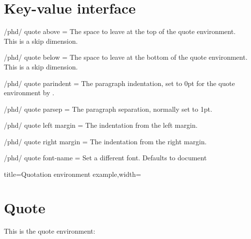 \section{Key-value interface}


\begin{key}{/phd/ quote above = } The space to leave at the top of the quote environment. This is a skip dimension. 
\end{key}

\begin{key}{/phd/ quote below = } The space to leave at the bottom of the quote environment. This is a skip dimension. 
\end{key}
\begin{key}{/phd/ quote parindent = } The paragraph indentation, set to 0pt for the quote environment by
\latex.
\end{key}
\begin{key}{/phd/ quote parsep = } The paragraph separation, normally set to 1pt.
\end{key}
\begin{key}{/phd/ quote left margin = } The indentation from the left margin.
\end{key}
\begin{key}{/phd/ quote right margin = } The indentation from the right margin.
\end{key}

\begin{key}{/phd/ quote font-name = } Set a different font. Defaults to document 
\end{key}
\begin{tcblisting}{title=Quotation environment example,width=\textwidth}
\bgroup
{}
\lorem

\begin{quotation}
\lipsum[2-3]
\end{quotation}
\egroup
\end{tcblisting}

\section{Quote}
This is the quote environment:
\begin{quote}
\lipsum[1-2]
\end{quote}



